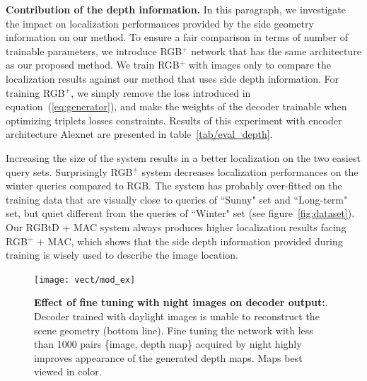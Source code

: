 \vspace{4pt}\noindent\textbf{Contribution of the depth information.} In this paragraph, we investigate the impact on localization performances provided by the side geometry information on our method. To ensure a fair comparison in terms of number of trainable parameters, we introduce RGB$^+$ network that has the same architecture as our proposed method. We train RGB$^+$ with images only to compare the localization results against our method that uses side depth information. For training RGB$^+$, we simply remove the loss introduced in equation~(\ref{eq:generator}), and make the weights of the decoder trainable when optimizing triplets losses constraints. Results of this experiment with encoder architecture Alexnet are presented in table~\ref{tab/eval_depth}.



Increasing the size of the system results in a better localization on the two easiest query sets. Surprisingly RGB$^{+}$ system decreases localization performances on the winter queries compared to RGB. The system has probably over-fitted on the training data that are visually close to queries of ``Sunny" set and ``Long-term" set, but quiet different from the queries of ``Winter" set (see figure~\ref{fig:dataset}). Our RGBtD + MAC system always produces higher localization results facing RGB$^{+}$ + MAC, which shows that the side depth information provided during training is wisely used to describe the image location. 

\begin{figure}
	\center
	\texttt{[image: vect/mod\_ex]}	
	\caption{\label{fig:mod_ex} \textbf{Effect of fine tuning with night images on decoder output:}. Decoder trained with daylight images is unable to reconstruct the scene geometry (bottom line). Fine tuning the network with less than 1000 pairs \{image, depth map\} acquired by night highly improves appearance of the generated depth maps. Maps best viewed in color.}
	\vspace{-0.25cm}
\end{figure}

